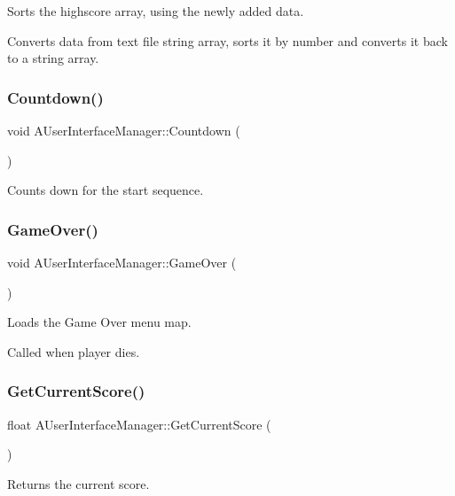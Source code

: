 Sorts the highscore array, using the newly added data. 

Converts data from text file string array, sorts it by number and converts it back to a string array. \mbox{\label{class_a_user_interface_manager_af3e35993c6a778b2d1dd50e377839296}} 
\subsubsection{Countdown()}
{\footnotesize\ttfamily void A\+User\+Interface\+Manager\+::\+Countdown (\begin{DoxyParamCaption}{ }\end{DoxyParamCaption})}



Counts down for the start sequence. 

\mbox{\label{class_a_user_interface_manager_aa77f6ee265e9eb803e587e124242e545}} 
\subsubsection{GameOver()}
{\footnotesize\ttfamily void A\+User\+Interface\+Manager\+::\+Game\+Over (\begin{DoxyParamCaption}{ }\end{DoxyParamCaption})}



Loads the Game Over menu map. 

Called when player dies. \mbox{\label{class_a_user_interface_manager_a1fd0354c446579ba0a7fdc7cc0fd520f}} 
\subsubsection{GetCurrentScore()}
{\footnotesize\ttfamily float A\+User\+Interface\+Manager\+::\+Get\+Current\+Score (\begin{DoxyParamCaption}{ }\end{DoxyParamCaption})}



Returns the current score. 

